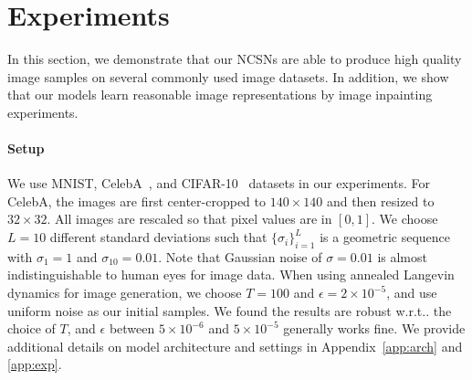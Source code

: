 \documentclass{article}
\makeatletter
\def\@onedot{\ifx\@let@token.\else.\null\fi\xspace}
\DeclareRobustCommand\onedot{\futurelet\@let@token\@onedot}
\def\wrt{w.r.t\onedot}
\makeatother
\begin{document}
 \section{Experiments}
In this section, we demonstrate that our NCSNs are able to produce high quality image samples on several commonly used image datasets. In addition, we show that our models learn reasonable image representations by image inpainting experiments.

\paragraph{Setup} We use MNIST, CelebA~\cite{liu2015faceattributes}, and CIFAR-10~\cite{Krizhevsky09learningmultiple} datasets in our experiments. For CelebA, the images are first center-cropped to $140\times 140$ and then resized to $32 \times 32$. All images are rescaled so that pixel values are in $[0, 1]$. We choose $L = 10$ different standard deviations such that $\{\sigma_i\}_{i=1}^L$ is a geometric sequence with $\sigma_1 = 1$ and $\sigma_{10} = 0.01$. Note that Gaussian noise of $\sigma=0.01$ is almost indistinguishable to human eyes for image data. When using annealed Langevin dynamics for image generation, we choose $T = 100$ and $\epsilon = 2\times 10^{-5}$, and use uniform noise as our initial samples. We found the results are robust \wrt the choice of $T$, and $\epsilon$ between $5\times 10^{-6}$ and $5 \times 10^{-5}$ generally works fine. We provide additional details on model architecture and settings in Appendix~\ref{app:arch} and \ref{app:exp}.
\end{document}
